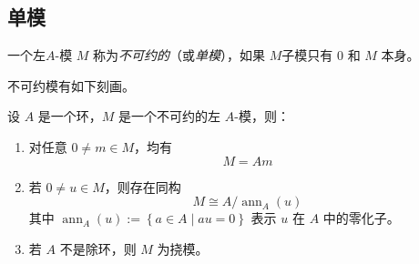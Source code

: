 \documentclass[12pt,a4paper]{ctexrep}   %
\begin{document}
\subsection{单模}
\begin{definition}
    一个左$A$-模 $M$ 称为\emph{不可约的}（或\emph{单模}），如果 $M$子模只有 $0$ 和 $M$ 本身。
\end{definition}
不可约模有如下刻画。
\begin{proposition}
    设 $A$ 是一个环，$M$ 是一个不可约的左 $A$-模，则：
    \begin{enumerate}[label=(\arabic*)]
        \item 对任意 $0 \neq m \in M$，均有
              \[
                  M = Am
              \]
        \item 若 $0 \neq u \in M$，则存在同构
              \[
                  M \cong A / \operatorname{ann}_A(u)
              \]
              其中 $\operatorname{ann}_A(u):=\left\{a\in A\mid au=0\right\}$ 表示 $u$ 在 $A$ 中的零化子。
        \item 若 $A$ 不是除环，则 $M$ 为挠模。
    \end{enumerate}
\end{proposition}
\end{document}
